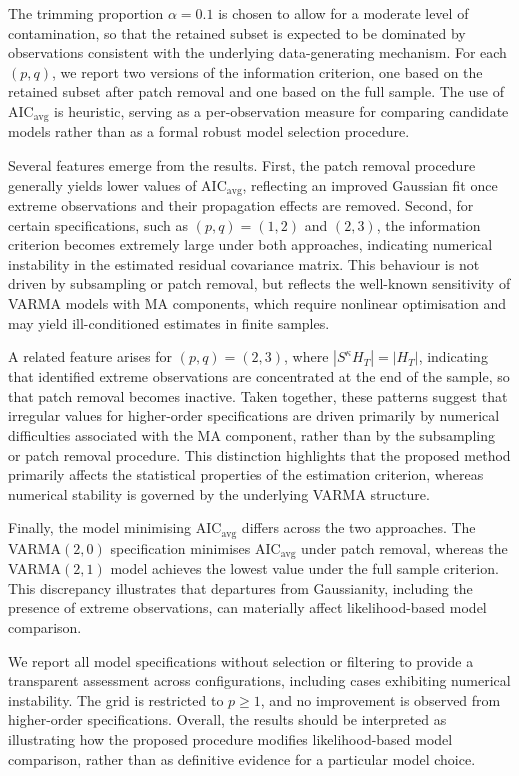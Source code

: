 \documentclass[12pt]{article}
\numberwithin{equation}{section}
\begin{document}
The trimming proportion $\alpha=0.1$ is chosen to allow for a moderate level of contamination, so that the retained subset is expected to be dominated by observations consistent with the underlying data-generating mechanism. For each $(p,q)$, we report two versions of the information criterion, one based on the retained subset after patch removal and one based on the full sample. The use of $\mathrm{AIC}_{\mathrm{avg}}$ is heuristic, serving as a per-observation measure for comparing candidate models rather than as a formal robust model selection procedure.

Several features emerge from the results. First, the patch removal procedure generally yields lower values of $\mathrm{AIC}_{\mathrm{avg}}$, reflecting an improved Gaussian fit once extreme observations and their propagation effects are removed. Second, for certain specifications, such as $(p,q)=(1,2)$ and $(2,3)$, the information criterion becomes extremely large under both approaches, indicating numerical instability in the estimated residual covariance matrix. This behaviour is not driven by subsampling or patch removal, but reflects the well-known sensitivity of VARMA models with MA components, which require nonlinear optimisation and may yield ill-conditioned estimates in finite samples. 

A related feature arises for $(p,q)=(2,3)$, where $|S^\kappa H_T| = |H_T|$, indicating that identified extreme observations are concentrated at the end of the sample, so that patch removal becomes inactive. Taken together, these patterns suggest that irregular values for higher-order specifications are driven primarily by numerical difficulties associated with the MA component, rather than by the subsampling or patch removal procedure. This distinction highlights that the proposed method primarily affects the statistical properties of the estimation criterion, whereas numerical stability is governed by the underlying VARMA structure.

Finally, the model minimising $\mathrm{AIC}_{\mathrm{avg}}$ differs across the two approaches. The VARMA$(2,0)$ specification minimises $\mathrm{AIC}_{\mathrm{avg}}$ under patch removal, whereas the VARMA$(2,1)$ model achieves the lowest value under the full sample criterion. This discrepancy illustrates that departures from Gaussianity, including the presence of extreme observations, can materially affect likelihood-based model comparison.

We report all model specifications without selection or filtering to provide a transparent assessment across configurations, including cases exhibiting numerical instability. The grid is restricted to $p \geq 1$, and no improvement is observed from higher-order specifications. Overall, the results should be interpreted as illustrating how the proposed procedure modifies likelihood-based model comparison, rather than as definitive evidence for a particular model choice.
\end{document}
